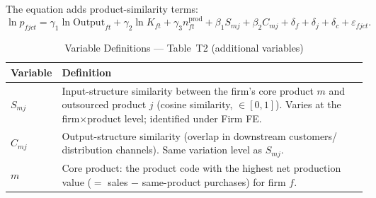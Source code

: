 \documentclass[12pt]{article}
\begin{document}
The equation adds product-similarity terms:
\begin{equation}
  \ln p_{fjct}
  = \gamma_1 \ln \text{Output}_{ft}
  + \gamma_2 \ln K_{ft}
  + \gamma_3 n^{\text{prod}}_{ft}
  + \beta_1 S_{mj}
  + \beta_2 C_{mj}
  + \delta_f + \delta_j + \delta_c
  + \varepsilon_{fjct}.
  \label{eq:t2}
\end{equation}

\begin{table}[H]
  \centering
  \caption{Variable Definitions --- Table~T2 (additional variables)}
  \label{tab:vardef_t2}
  \begin{tabular}{L{3.5cm} L{10.5cm}}
    \toprule
    Variable & Definition \\
    \midrule
    \(S_{mj}\) &
      Input-structure similarity between the firm's core product \(m\) and
      outsourced product \(j\) (cosine similarity, \(\in[0,1]\)).
      Varies at the firm\(\times\)product level; identified under Firm FE. \\[4pt]
    \(C_{mj}\) &
      Output-structure similarity (overlap in downstream customers/
      distribution channels). Same variation level as \(S_{mj}\). \\[4pt]
    \(m\) &
      Core product: the product code with the highest net production value
      (\(=\) sales \(-\) same-product purchases) for firm \(f\). \\
    \bottomrule
  \end{tabular}
\end{table}
\end{document}
